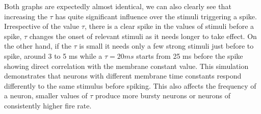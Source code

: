 \documentclass[11pt]{article}
\begin{document}
Both graphs are expectedly almost identical, we can also clearly see that increasing the $\tau$ has quite significant influence over the stimuli triggering a spike. Irrespective of the value $\tau$, there is a clear spike in the values of stimuli before a spike, $\tau$ changes the onset of relevant stimuli as it needs longer to take effect. On the other hand, if the $\tau$ is small it needs only a few strong stimuli just before to spike, around 3 to 5 ms while a $\tau = 20 ms$ starts from 25 ms before the spike showing direct correlation with the membrane constant value. This simulation demonstrates that neurons with different membrane time constants respond differently to the same stimulus before spiking. This also affects the frequency of a neuron, smaller values of $\tau$ produce more bursty neurons or neurons of consistently higher fire rate.
\end{document}
